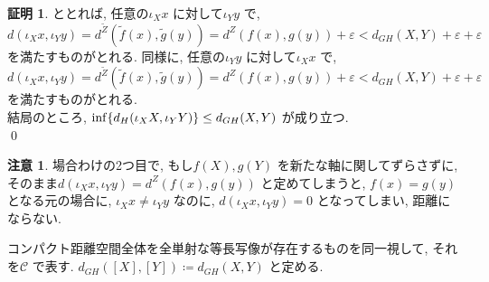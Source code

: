 \documentclass[10pt, fleqn, label-section=none, titlepage]{bxjsarticle}
\theoremstyle{definition}
\newtheorem*{pf*}{証明}
\newtheorem{remark}[dfn]{注意}
\newcommand{\veps}{\varepsilon}
\newcommand{\cbra}[1]{\mleft\{#1\mright\}}
\begin{document}
\begin{pf*}
ととれば, 任意の$\iota_X x$ に対して$\iota_Y y$ で, $d(\iota_X x , \iota_Y y) = d^{\tilde Z} (\tilde f (x), \tilde g (y) ) = d^Z (f(x), g(y) ) + \veps  < d_{GH}(X,Y) + \veps + \veps $ を満たすものがとれる.  同様に, 任意の$\iota_Y y$ に対して$\iota_X x$ で, $d(\iota_X x , \iota_Y y) = d^{\tilde Z} (\tilde f (x), \tilde g (y) ) = d^Z (f(x), g(y) ) + \veps  < d_{GH}(X,Y) + \veps + \veps $ を満たすものがとれる. \\
結局のところ, $\inf \cbra{d_H (\iota_X X, \iota_Y Y)} \leq d_{GH} (X,Y)$ が成り立つ. \\
\qed
\end{pf*}

\begin{remark}
場合わけの2つ目で, もし$f(X), g(Y)$ を新たな軸に関してずらさずに, そのまま$d(\iota_X x , \iota_Y y) = d^Z (f(x), g(y))$ と定めてしまうと, $f(x) = g(y)$ となる元の場合に, $\iota_X x \neq \iota_Y y$ なのに, $d(\iota_X x , \iota_Y y) = 0$ となってしまい, 距離にならない.
\end{remark}

\newpage 

コンパクト距離空間全体を全単射な等長写像が存在するものを同一視して, それを$\mathcal{C}$ で表す.
$d_{GH}([X],[Y]) \coloneqq d_{GH}(X,Y)$ と定める.
\end{document}
